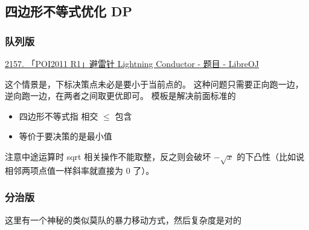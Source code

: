 \subsection{四边形不等式优化 DP}

\subsubsection{队列版}

\href{https://loj.ac/p/2157}{2157. 「POI2011 R1」避雷针 Lightning Conductor - 题目 - LibreOJ}

这个情景是，下标决策点未必是要小于当前点的。
这种问题只需要正向跑一边，逆向跑一边，在两者之间取更优即可。
模板是解决前面标准的
\begin{itemize}
    \item 四边形不等式指 相交 $\le$ 包含
    \item 等价于要决策的是最小值
\end{itemize}

注意中途运算时 sqrt 相关操作不能取整，反之则会破坏 $-\sqrt{x}$ 的下凸性（比如说相邻两项点值一样斜率就直接为 0 了）。



\subsubsection{分治版}

这里有一个神秘的类似莫队的暴力移动方式，然后复杂度是对的

